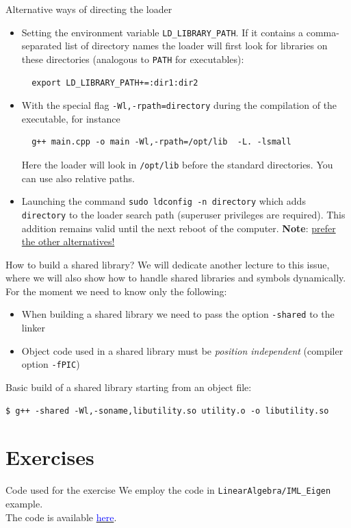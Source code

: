 \documentclass[10pt,aspectratio=169]{beamer}
\begin{document}
\begin{frame}[fragile]{Alternative ways of directing the loader}
  \begin{itemize}
  \item Setting the environment variable \texttt{LD\_LIBRARY\_PATH}. If
    it contains a comma-separated list of directory names the
    loader will first look for libraries on these directories (analogous to \texttt{PATH} for executables):
\begin{verbatim}
  export LD_LIBRARY_PATH+=:dir1:dir2
\end{verbatim}
\item With the special flag \texttt{-Wl,-rpath=directory}
  during the compilation of the executable, for instance
\begin{verbatim}
  g++ main.cpp -o main -Wl,-rpath=/opt/lib  -L. -lsmall
\end{verbatim}
Here the loader will look in \texttt{/opt/lib} before the standard directories. You can use also relative paths.
\item Launching the command \texttt{sudo ldconfig -n directory} which adds \texttt{directory} to the loader search path (superuser privileges are required). This addition remains valid until the next reboot of the computer. \textbf{Note}: \underline{prefer the other alternatives!}
  \end{itemize}
\end{frame}

\begin{frame}[fragile]{How to build a shared library?}
  We will dedicate another lecture to this issue, where we will also show how to handle shared libraries and symbols dynamically.
  For the moment we need to know only the following:
  \begin{itemize}
  \item When building a shared library we need to pass the option \texttt{-shared} to the linker
  \item Object code used in a shared library must be \emph{position independent} (compiler option \texttt{-fPIC})
  \end{itemize}

  Basic build of a shared library starting from an object file:
\begin{verbatim}
$ g++ -shared -Wl,-soname,libutility.so utility.o -o libutility.so
\end{verbatim}
\end{frame}


\section{Exercises}
\begin{frame}{Code used for the exercise}
  We employ the code in \texttt{LinearAlgebra/IML\_Eigen} example. \\
  The code is available \href{https://github.com/pacs-course/pacs-examples/tree/master/Labs/2024/02-compile}{ \textcolor{blue}{here}}.
\end{frame}
\end{document}
